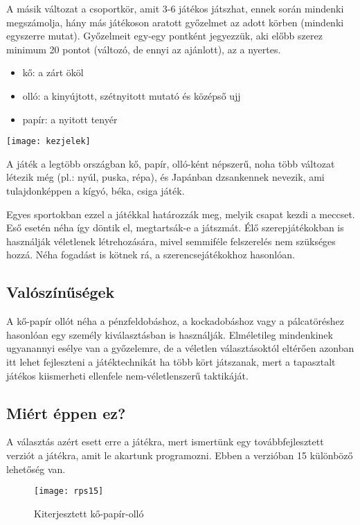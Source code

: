 \documentclass[a4paper, 12pt]{article}
\begin{document}
A másik változat a csoportkör, amit 3-6 játékos játszhat, ennek során mindenki megszámolja, hány más játékoson aratott győzelmet az adott körben (mindenki egyszerre mutat). Győzelmeit egy-egy pontként jegyezzük, aki előbb szerez minimum 20 pontot (változó, de ennyi az ajánlott), az a nyertes.

\begin{itemize}
\item kő: a zárt ököl
\item olló: a kinyújtott, szétnyitott mutató és középső ujj
\item papír: a nyitott tenyér
\end{itemize}
\begin{center}
\texttt{[image: kezjelek]}
\end{center}

A játék a legtöbb országban kő, papír, olló-ként népszerű, noha több változat létezik még (pl.: nyúl, puska, répa), és Japánban dzsankennek nevezik, ami tulajdonképpen a kígyó, béka, csiga játék.

Egyes sportokban ezzel a játékkal határozzák meg, melyik csapat kezdi a meccset. Eső esetén néha így döntik el, megtartsák-e a játszmát. Élő szerepjátékokban is használják véletlenek létrehozására, mivel semmiféle felszerelés nem szükséges hozzá. Néha fogadást is kötnek rá, a szerencsejátékokhoz hasonlóan.

\subsection{ Valószínűségek }

A kő-papír ollót néha a pénzfeldobáshoz, a kockadobáshoz vagy a pálcatöréshez hasonlóan egy személy kiválasztásban is használják. Elméletileg mindenkinek ugyanannyi esélye van a győzelemre, de a véletlen választásoktól eltérően azonban itt lehet fejleszteni a játéktechnikát ha több kört játszanak, mert a tapasztalt játékos kiismerheti ellenfele nem-véletlenszerű taktikáját. 

\newpage
\subsection{ Miért éppen ez?}

A választás azért esett erre a játékra, mert ismertünk egy továbbfejlesztett verziót a játékra, amit le akartunk programozni. Ebben a verzióban 15 különböző lehetőség van.

\begin{figure}[H]
\centering
\texttt{[image: rps15]}
\caption{ Kiterjesztett kő-papír-olló}
\label{fig:rps15}
\end{figure}
\end{document}
